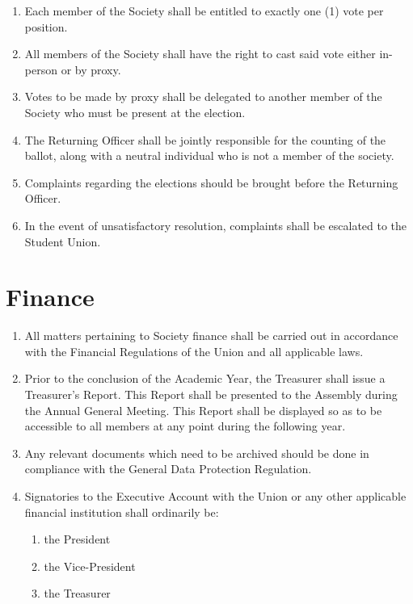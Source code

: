 \documentclass[parskip=half]{scrartcl}
\begin{document}
\begin{enumerate}
                \item Each member of the Society shall be entitled to exactly one (1) vote per position.
                
                \item All members of the Society shall have the right to cast said vote either in-person or by proxy.
                
                \item Votes to be made by proxy shall be delegated to another member of the Society who must be present at the election.
                
                \item The Returning Officer shall be jointly responsible for the counting of the ballot, along with a neutral individual who is not a member of the society.
                
                \item Complaints regarding the elections should be brought before the Returning Officer.
                
                \item In the event of unsatisfactory resolution, complaints shall be escalated to the Student Union.
            \end{enumerate}
            
    \clearpage
    \section{Finance}
        \label{finance}
        \begin{enumerate}
            \item All matters pertaining to Society finance shall be carried out in accordance with the Financial Regulations of the Union and all applicable laws.
            
            \item Prior to the conclusion of the Academic Year, the Treasurer shall issue a Treasurer's Report.
                \subitem This Report shall be presented to the Assembly during the Annual General Meeting.
                \subitem This Report shall be displayed so as to be accessible to all members at any point during the following year.
            \item Any relevant documents which need to be archived should be done in compliance with the General Data Protection Regulation.
            
            \item Signatories to the Executive Account with the Union or any other applicable financial institution shall ordinarily be:
                \begin{enumerate}
                    \item the President 
                    \item the Vice-President
                    \item the Treasurer
                \end{enumerate}
        \end{enumerate}
\end{document}
